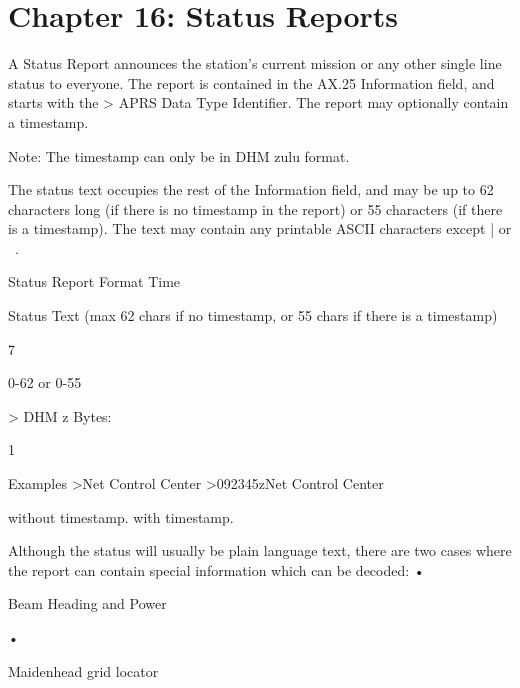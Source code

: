 \chapter{Chapter 16: Status Reports}


A Status Report announces the station’s current mission or any other single
line status to everyone. The report is contained in the AX.25 Information
field, and starts with the > APRS Data Type Identifier.
The report may optionally contain a timestamp.

Note: The timestamp can only be in DHM zulu format.

The status text occupies the rest of the Information field, and may be up to 62
characters long (if there is no timestamp in the report) or 55 characters (if
there is a timestamp). The text may contain any printable ASCII characters
except | or ~.


Status Report Format
Time

Status Text
(max 62 chars if no timestamp, or 55 chars if there is a timestamp)

7

0-62 or 0-55

> DHM z
Bytes:

1

Examples
>Net Control Center
>092345zNet Control Center

without timestamp.
with timestamp.

Although the status will usually be plain language text, there are two cases
where the report can contain special information which can be decoded:
•

Beam Heading and Power

•

Maidenhead grid locator
